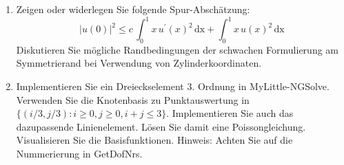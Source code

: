 \documentclass[11pt,a4paper]{report}
\begin{document}
\begin{enumerate}
\item Zeigen oder widerlegen Sie folgende Spur-Absch\"atzung:
$$
|u(0)|^2 \leq c \, \int_0^1 x \, u^\prime(x)^2 \, \text{dx} + \int_0^1
x \, u(x)^2 \, \text{dx}
$$
Diskutieren Sie m\"ogliche Randbedingungen der schwachen Formulierung
am Symmetrierand bei Verwendung von Zylinderkoordinaten.


\item 
Implementieren Sie ein Dreieckselement 3. Ordnung in
MyLittle-NGSolve. Verwenden Sie die Knotenbasis zu Punktauswertung in
$\{ (i/3, j/3) : i \geq 0, j \geq 0, i+j \leq 3 \}$. Implementieren
Sie auch das dazupassende Linienelement.
L\"osen Sie damit eine Poissongleichung.
Visualisieren Sie die Basisfunktionen.  
Hinweis: Achten Sie auf die Nummerierung in GetDofNrs.

  
\end{enumerate}
\end{document}
